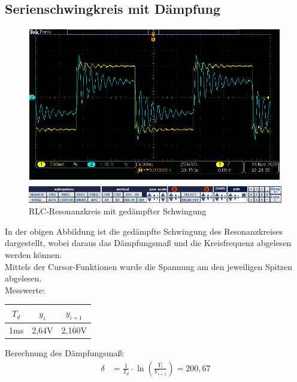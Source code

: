 \documentclass{article}
\begin{document}
\subsection{Serienschwingkreis mit Dämpfung}

  \begin{figure}[h]
    \begin{center}
      \includegraphics[scale=0.5]{../assets/images/ETP3/Aufgabe210PeriodenSchwingung.PNG}
      \caption{RLC-Resonanzkreis mit gedämpfter Schwingung}
    \end{center}
  \end{figure}

  In der obigen Abbildung ist die gedämpfte Schwingung des Resonanzkreises dargestellt, wobei daraus das Dämpfungsmaß und die Kreisfrequenz abgelesen werden können.\\
 Mittels der Cursor-Funktionen wurde die Spannung am den jeweiligen Spitzen abgelesen.\\
Messwerte:
\begin{table}[h]
  \begin{center}

    \begin{tabular}{|c|c|c|}
      \hline
      $T_d$ & $y_i$ & $y_{i+1}$ \\
      \hline
      1ms   & 2,64V & 2,160V    \\
      \hline
    \end{tabular}
  \end{center}
\end{table}
\newpage
Berechnung des Dämpfungsmaß:
\begin{align*}
  \delta   & = \frac{1}{T_d} \cdot \ln \left(\frac{Y_i}{Y_{i+1}}\right) = 200,67      \\
\end{align*}
\end{document}
